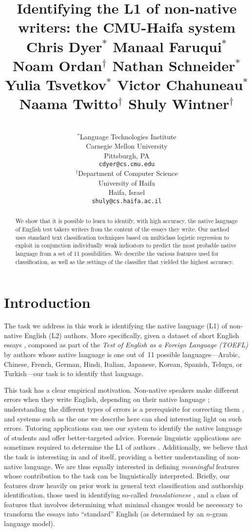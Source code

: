\documentclass[11pt,letterpaper]{article}
\title{Identifying the L1 of non-native writers: the CMU-Haifa system\\[1em]
{\large Chris Dyer$^\ast$ Manaal Faruqui$^\ast$ Noam Ordan$^\dagger$ Nathan Schneider$^\ast$\\ Yulia Tsvetkov$^\ast$ Victor Chahuneau$^\ast$ Naama Twitto$^\dagger$ Shuly Wintner$^\dagger$}\\[-3em]
}
\author{
\\
$^\ast$Language Technologies Institute\\Carnegie Mellon University\\Pittsburgh, PA\\\texttt{cdyer@cs.cmu.edu}
\And
\\
$^\dagger$Department of Computer Science\\University of Haifa\\Haifa, Israel\\\texttt{shuly@cs.haifa.ac.il}
%
%
%
%
}
\date{}
\begin{document}
\maketitle
\begin{abstract}
We show that it is possible to learn to identify, with high accuracy, the native language of English test takers writers from the content of the essays they write.  Our method uses standard text classification
techniques based on multiclass logistic regression to exploit in conjunction individually weak indicators to predict the most probable native language from a set of 11 possibilities. We describe the various features
used for classification, as well as the settings of the classifier
that yielded the highest accuracy.
\end{abstract}

\section{Introduction}
\label{sec:intro}
The task we address in this work is identifying the native language
(L1) of non-native English (L2) authors. More specifically, given a
dataset of short English essays
\citep{blanchard-tetreault-higgins-cahill-chodorow:2013:TOEFL11-RR},
composed as part of the \emph{Test of English as a Foreign Language
  (TOEFL)} by authors whose native language is one out of~11 possible
languages---Arabic, Chinese, French, German, Hindi, Italian, Japanese,
Korean, Spanish, Telugu, or Turkish---our task is to identify that
language.

This task has a clear empirical motivation. Non-native speakers make
different errors when they write English, depending on their native
language \citep{lado-57,swan2001learner}; understanding the different types of
errors is a prerequisite for correcting them
\citep{Leacock:2010:AGE:1855062}, and systems such as the one we
describe here can shed interesting light on such errors. Tutoring
applications can use our system to identify the native language of
students and offer better-targeted advice. Forensic linguistic
applications are sometimes required to determine the L1 of authors
\citep{estival-gaustad-pham-radford-hutchinson:2007:ALTA2007,estival2007author}. Additionally,
we believe that the task is interesting in and of itself, providing a
better understanding of non-native language. We are thus equally
interested in defining \emph{meaningful} features whose contribution
to the task can be linguistically interpreted. Briefly, our features draw heavily on prior work in general text classification and authorship identification, those used in identifying so-called \emph{translationese} \cite{vered:noam:shuly}, and a class of features that involves  determining what minimal changes would be necessary to transform the essays into ``standard'' English (as determined by an $n$-gram language model).
\end{document}
